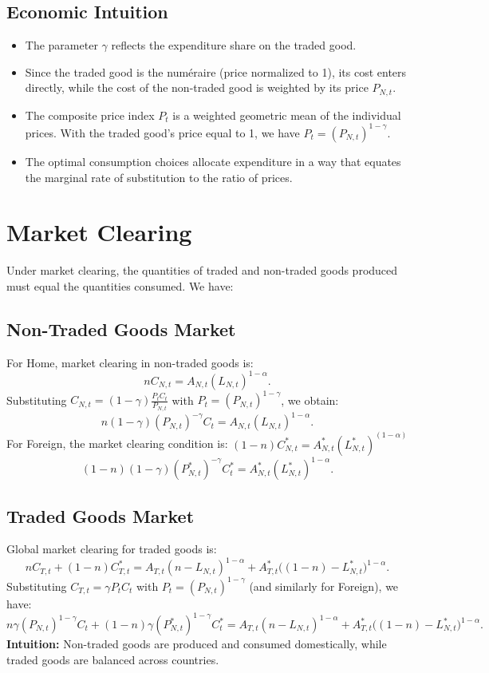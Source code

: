 \documentclass[a4paper,12pt]{article} %
\theoremstyle{nonitalic}
\begin{document}
\subsection*{Economic Intuition}
\begin{itemize}
    \item The parameter $\gamma$ reflects the expenditure share on the traded good.
    \item Since the traded good is the num\'eraire (price normalized to 1), its cost enters directly, while the cost of the non-traded good is weighted by its price $P_{N,t}$.
    \item The composite price index $P_t$ is a weighted geometric mean of the individual prices. With the traded good's price equal to 1, we have $P_t = (P_{N,t})^{1-\gamma}$.
    \item The optimal consumption choices allocate expenditure in a way that equates the marginal rate of substitution to the ratio of prices.
\end{itemize}

\section{Market Clearing}
Under market clearing, the quantities of traded and non-traded goods produced must equal the quantities consumed. We have:
\subsection*{Non-Traded Goods Market}
For Home, market clearing in non-traded goods is:
\[
n C_{N,t} = A_{N,t} (L_{N,t})^{ 1-\alpha}.
\]
Substituting $ C_{N,t} = (1-\gamma)\frac{P_t C_t}{P_{N,t}}$ with $ P_t = (P_{N,t})^{1-\gamma} $, we obtain:
\[
\boxed{n(1-\gamma) (P_{N,t})^{-\gamma} C_t = A_{N,t} (L_{N,t})^{ 1-\alpha}.}
\]
For Foreign, the market clearing condition is: $(1-n)C_{N,t}^* = A_{N,t}^*(L_{N,t}^*)^{(1-\alpha)}$
\[
\boxed{(1-n)(1-\gamma) (P^*_{N,t})^{-\gamma} C^*_t = A^*_{N,t} (L^*_{N,t})^{ 1-\alpha}.}
\]

\subsection*{Traded Goods Market}
Global market clearing for traded goods is:
\[
n C_{T,t} + (1-n) C^*_{T,t} = A_{T,t} (n-L_{N,t})^{ 1-\alpha} + A^*_{T,t} \big((1-n)-L^*_{N,t}\big)^{ 1-\alpha}.
\]
Substituting $ C_{T,t}=\gamma P_t C_t $ with $ P_t=(P_{N,t})^{1-\gamma} $ (and similarly for Foreign), we have:
\[
\boxed{n\gamma (P_{N,t})^{1-\gamma} C_t + (1-n)\gamma (P^*_{N,t})^{1-\gamma} C^*_t = A_{T,t} (n-L_{N,t})^{ 1-\alpha} + A^*_{T,t} \big((1-n)-L^*_{N,t}\big)^{ 1-\alpha}.}
\]
\textbf{Intuition:} Non-traded goods are produced and consumed domestically, while traded goods are balanced across countries.
\end{document}
